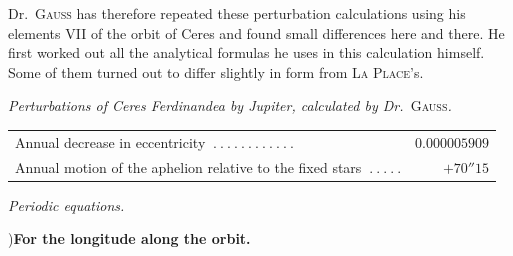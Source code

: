 Dr.\ \textsc{Gauss} has therefore repeated these perturbation calculations using his elements VII of the orbit of Ceres and found small differences here and there. He first worked out all the analytical formulas he uses in this calculation himself. Some of them turned out to differ slightly in form from \textsc{La Place}’s.
\begin{center}
\textit{Perturbations of Ceres Ferdinandea by Jupiter, calculated by Dr.\ }\textsc{Gauss}\textit{.}\par\medskip
{\small\setlength{\tabcolsep}{3pt}
\begin{tabular}{l r}
Annual decrease in eccentricity $\ .\ .\ .\ .\ .\ .\ .\ .\ .\ .\ .\ .$&$0.000005909$\\
Annual motion of the aphelion relative to the fixed stars $\ .\ .\ .\ .\ .$&$+70''15$
\end{tabular}}
\par{}\bigskip
\textit{Periodic equations.}\par{})\quad \textbf{For the longitude along the orbit.}
\end{center}
